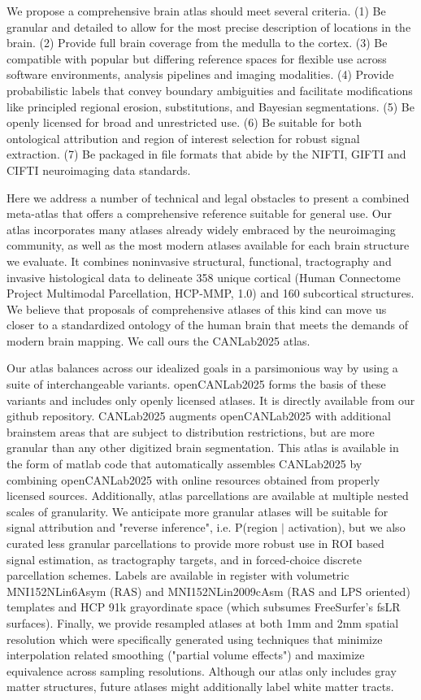 \documentclass[10pt,letterpaper]{article}
\begin{document}
We propose a comprehensive brain atlas should meet several criteria. (1) Be granular and detailed to allow for the most precise description of locations in the brain. (2) Provide full brain coverage from the medulla to the cortex. (3) Be compatible with popular but differing reference spaces for flexible use across software environments, analysis pipelines and imaging modalities. (4) Provide probabilistic labels that convey boundary ambiguities and facilitate modifications like principled regional erosion, substitutions, and Bayesian segmentations. (5) Be openly licensed for broad and unrestricted use. (6) Be suitable for both ontological attribution and region of interest selection for robust signal extraction. (7) Be packaged in file formats that abide by the NIFTI, GIFTI and CIFTI neuroimaging data standards.

Here we address a number of technical and legal obstacles to present a combined meta-atlas that offers a comprehensive reference suitable for general use. Our atlas incorporates many atlases already widely embraced by the neuroimaging community, as well as the most modern atlases available for each brain structure we evaluate. It combines noninvasive structural, functional, tractography and invasive histological data to delineate 358 unique cortical (Human Connectome Project Multimodal Parcellation, HCP-MMP, 1.0) and 160 subcortical structures. We believe that proposals of comprehensive atlases of this kind can move us closer to a standardized ontology of the human brain that meets the demands of modern brain mapping. We call ours the CANLab2025 atlas.

Our atlas balances across our idealized goals in a parsimonious way by using a suite of interchangeable variants. openCANLab2025 forms the basis of these variants and includes only openly licensed atlases. It is directly available from our github repository. CANLab2025 augments openCANLab2025 with additional brainstem areas that are subject to distribution restrictions, but are more granular than any other digitized brain segmentation. This atlas is available in the form of matlab code that automatically assembles CANLab2025 by combining openCANLab2025 with online resources obtained from properly licensed sources. Additionally, atlas parcellations are available at multiple nested scales of granularity. We anticipate more granular atlases will be suitable for signal attribution and "reverse inference", i.e. P(region $\vert$ activation), but we also curated less granular parcellations to provide more robust use in ROI based signal estimation, as tractography targets, and in forced-choice discrete parcellation schemes. Labels are available in register with volumetric MNI152NLin6Asym (RAS) and MNI152NLin2009cAsm (RAS and LPS oriented) templates and HCP 91k grayordinate space (which subsumes FreeSurfer's fsLR surfaces). Finally, we provide resampled atlases at both 1mm and 2mm spatial resolution which were specifically generated using techniques that minimize interpolation related smoothing ("partial volume effects") and maximize equivalence across sampling resolutions. Although our atlas only includes gray matter structures, future atlases might additionally label white matter tracts.
\end{document}
